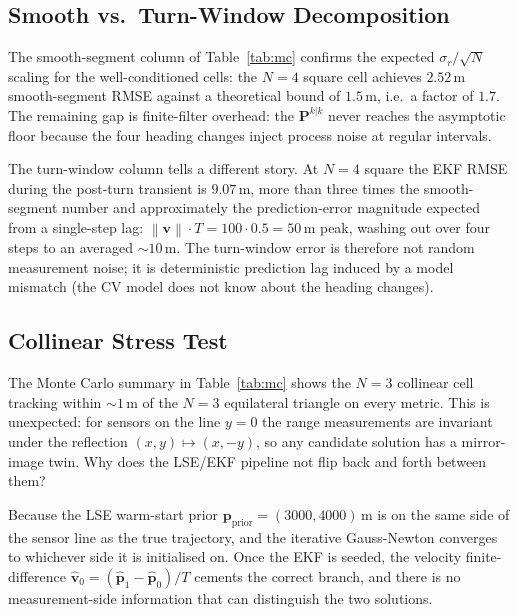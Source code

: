 \documentclass[11pt,a4paper]{article}
\newcommand{\norm}[1]{\left\lVert #1 \right\rVert}
\begin{document}
\subsection{Smooth vs.\ Turn-Window Decomposition}
\label{sec:smooth-vs-turn}

The smooth-segment column of Table~\ref{tab:mc} confirms the expected
$\sigma_r / \sqrt{N}$ scaling for the well-conditioned cells: the
$N{=}4$ square cell achieves $2.52\,\mathrm{m}$ smooth-segment RMSE
against a theoretical bound of $1.5\,\mathrm{m}$, i.e.\ a factor of $1.7$.
The remaining gap is finite-filter overhead: the
$\mathbf{P}^{k|k}$ never reaches the asymptotic floor because the four
heading changes inject process noise at regular intervals.

The turn-window column tells a different story.  At $N{=}4$ square the EKF
RMSE during the post-turn transient is $9.07\,\mathrm{m}$, more than
three times the smooth-segment number and approximately the
prediction-error magnitude expected from a single-step lag:
$\norm{\mathbf{v}} \cdot T = 100 \cdot 0.5 = 50\,\mathrm{m}$ peak,
washing out over four steps to an averaged $\sim$$10\,\mathrm{m}$.
The turn-window error is therefore not random measurement noise; it is
deterministic prediction lag induced by a model mismatch (the CV model
does not know about the heading changes).

\subsection{Collinear Stress Test}
\label{sec:collinear}

The Monte Carlo summary in Table~\ref{tab:mc} shows the $N{=}3$
collinear cell tracking within $\sim$$1\,\mathrm{m}$ of the
$N{=}3$ equilateral triangle on every metric.  This is unexpected: for
sensors on the line $y=0$ the range measurements are invariant under the
reflection $(x, y) \mapsto (x, -y)$, so any candidate solution has a
mirror-image twin.  Why does the LSE/EKF pipeline not flip back and forth
between them?

Because the LSE warm-start prior $\mathbf{p}_{\text{prior}} = (3000,
4000)\,\mathrm{m}$ is on the same side of the sensor line as the true
trajectory, and the iterative Gauss-Newton converges to whichever side it
is initialised on.  Once the EKF is seeded, the velocity finite-difference
$\hat{\mathbf{v}}_0 = (\hat{\mathbf{p}}_1 - \hat{\mathbf{p}}_0)/T$
cements the correct branch, and there is no measurement-side information
that can distinguish the two solutions.
\end{document}

